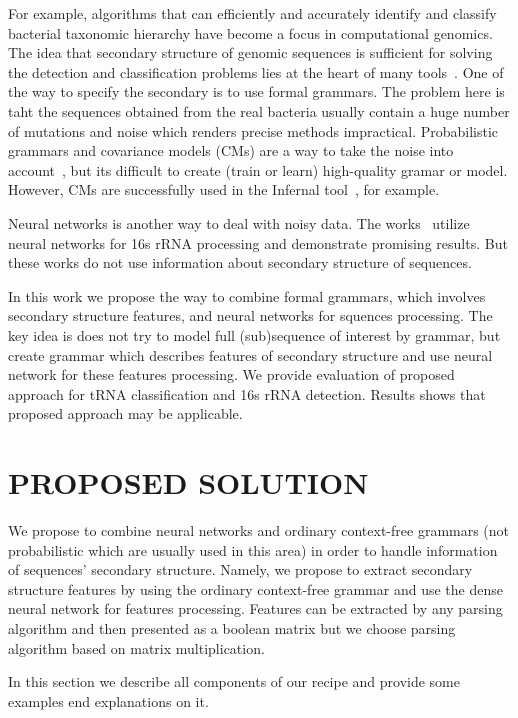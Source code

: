 \documentclass[a4paper,twoside]{article}
\begin{document}
For example, algorithms that can efficiently and accurately identify and classify bacterial taxonomic hierarchy have become a focus in computational genomics.
The idea that secondary structure of genomic sequences is sufficient for solving the detection and classification problems lies at the heart of many tools~\cite{GrammarsRNA,PCFG,meta,LWPCFG}.
One of the way to specify the secondary is to use formal grammars. 
The problem here is taht the sequences obtained from the real bacteria usually contain a huge number of mutations and noise which renders precise methods impractical. 
Probabilistic grammars and covariance models (CMs) are a way to take the noise into account~\cite{EddyDurbin}, but its difficult to create (train or learn) high-quality gramar or model.
However, CMs are successfully used in the Infernal tool~\cite{Infernal}, for example.

Neural networks is another way to deal with noisy data. 
The works~\cite{Humidor,ANN} utilize neural networks for 16s rRNA processing and demonstrate promising results.
But these works do not use information about secondary structure of sequences.

In this work we propose the way to combine formal grammars, which involves secondary structure features, and neural networks for squences processing.
The key idea is does not try to model full (sub)sequence of interest by grammar, but create grammar which describes features of secondary structure and use neural network for these features processing.
We provide evaluation of proposed approach for tRNA classification and 16s rRNA detection.
Results shows that proposed approach may be applicable.

\section{\uppercase{Proposed solution}}
\label{sec:proposedSolution}

\noindent We propose to combine neural networks and ordinary context-free grammars (not probabilistic which are usually used in this area) in order to handle information of sequences' secondary structure. 
Namely, we propose to extract secondary structure features by using the ordinary context-free grammar and use the dense neural network for features processing.
Features can be extracted by any parsing algorithm and then presented as a boolean matrix but we choose parsing algorithm based on matrix multiplication.

In this section we describe all components of our recipe and provide some examples end explanations on it.
 
\end{document}
